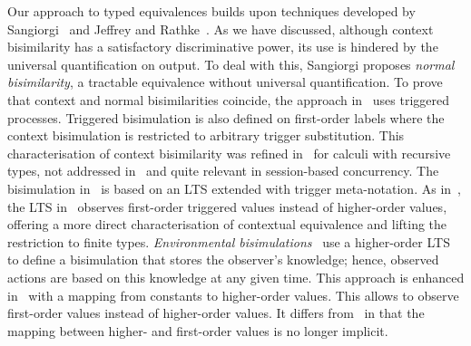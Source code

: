 Our approach %
to typed equivalences
builds upon techniques developed by Sangiorgi~\cite{SangiorgiD:expmpa,San96H}
and Jeffrey and Rathke~\cite{JeffreyR05}.
As we have discussed, although context bisimilarity has a satisfactory discriminative power,
its use is hindered by the universal quantification on output.
To deal with this, 
Sangiorgi proposes \emph{normal bisimilarity}, 
a tractable  equivalence without universal quantification. 
To prove that context and normal bisimilarities coincide, the approach in~\cite{SangiorgiD:expmpa} uses 
triggered processes.
Triggered bisimulation is also defined on first-order labels
where the context bisimulation is restricted to arbitrary
trigger substitution. %
This
characterisation of context bisimilarity  was refined in~\cite{JeffreyR05} for
calculi with recursive types, not addressed in~\cite{San96H,SangiorgiD:expmpa} and
quite relevant in %
session-based concurrency.
The
bisimulation in~\cite{JeffreyR05}
is based on an LTS  extended with trigger meta-notation.
As in~\cite{San96H,SangiorgiD:expmpa}, 
the LTS in~\cite{JeffreyR05}
observes first-order triggered values instead of
higher-order values, offering a more direct characterisation of contextual equivalence
and lifting the restriction to finite types.
\emph{Environmental bisimulations}~\cite{DBLP:conf/lics/SangiorgiKS07} 
use a higher-order LTS 
to define a bisimulation that stores the observer's knowledge; hence, observed actions are based on this knowledge
at any given time. This approach is enhanced in~\cite{DBLP:journals/cl/KoutavasH12}
with a mapping from constants to higher-order values. This 
allows to observe first-order values instead
of higher-order values. It differs from~\cite{San96H,JeffreyR05} in that 
the mapping between higher- and first-order values is no longer implicit.

